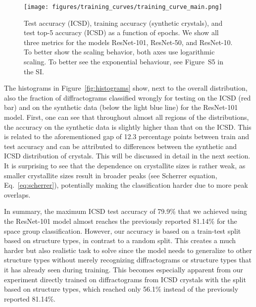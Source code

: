     \begin{figure}[!htbp] 
    \centering
    \texttt{[image: figures/training\_curves/training\_curve\_main.png]}
    \caption{Test accuracy (ICSD), training accuracy (synthetic crystals), and
    test top-5 accuracy (ICSD) as a function of epochs. We show all three
    metrics for the models ResNet-101, ResNet-50, and ResNet-10. To better show
    the scaling behavior, both axes use logarithmic scaling.  To better see the
    exponential behaviour, see Figure~S5 in the SI. }
    \label{fig:training_curve} 
    \end{figure}

    The histograms in Figure~\ref{fig:histograms} show, next to the overall
    distribution, also the fraction of diffractograms classified wrongly for
    testing on the ICSD (red bar) and on the synthetic data (below the light blue line)
    for the ResNet-101 model. First, one can see that throughout almost all
    regions of the distributions, the accuracy on the synthetic data is slightly
    higher than that on the ICSD. This is related to the aforementioned gap of 12.3
    percentage points between train and test accuracy and can be attributed to
    differences between the synthetic and ICSD distribution of crystals. This
    will be discussed in detail in the next section. It is surprising to see that the
    dependence on crystallite sizes is rather weak, as smaller crystallite sizes
    result in broader peaks (see Scherrer equation, Eq.~\ref{eq:scherrer}), potentially making the
    classification harder due to more peak overlaps.

    In summary, the maximum ICSD test accuracy of 79.9\% that we achieved using
    the ResNet-101 model almost reaches the previously
    reported\supercite{parkClassificationCrystalStructure2017} 81.14\% for the
    space group classification. However, our accuracy is based on a train-test
    split based on structure types, in contrast to a random split. This creates
    a much harder but also realistic task to solve since the model needs to
    generalize to other structure types without merely recognizing
    diffractograms or structure types that it has already seen during training.
    This becomes especially apparent from our experiment directly trained on
    diffractograms from ICSD crystals with the split based on structure types,
    which reached only 56.1\% instead of the previously
    reported\supercite{parkClassificationCrystalStructure2017} 81.14\%.

